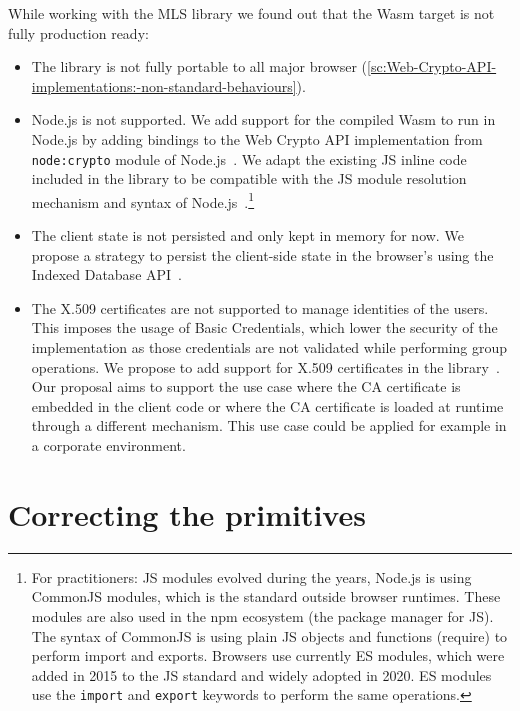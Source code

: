 While working with the MLS library we found out that the Wasm target
is not fully production ready:
\begin{itemize}
    \item The library is not fully portable to all major browser (\cref{sc:Web-Crypto-API-implementations:-non-standard-behaviours}).
    \item Node.js is not supported. We add support for the compiled Wasm to run in Node.js by adding bindings to the Web Crypto API implementation from \texttt{node:crypto} module of Node.js~\cite{NodeJsWebCryptoAPI}. We adapt the existing JS inline code included in the library to be compatible with the JS module resolution mechanism and syntax of Node.js~\cite{AWSNodeJSCodeContributions}.\footnote{For practitioners: JS modules evolved during the years, Node.js is using CommonJS modules, which is the standard outside browser runtimes. These modules are also used in the npm ecosystem (the package manager for JS). The syntax of CommonJS is using plain JS objects and functions (require) to perform import and exports. Browsers use currently ES modules, which were added in 2015 to the JS standard and widely adopted in 2020. ES modules use the \texttt{import} and \texttt{export} keywords to perform the same operations.}
    \item The client state is not persisted and only kept in memory for now. We propose a strategy to persist the client-side state in the browser's using the Indexed Database API~\cite{MlsRsWebStorageProvider, IndexedDBAPI}.
    \item The X.509 certificates are not supported to manage identities of the users. This imposes the usage of Basic Credentials, which lower the security of the implementation as those credentials are not validated while performing group operations. We propose to add support for X.509 certificates in the library~\cite{MlsRsX509Certificates}. Our proposal aims to support the use case where the CA certificate is embedded in the client code or where the CA certificate is loaded at runtime through a different mechanism. This use case could be applied for example in a corporate environment.
\end{itemize}


\section{Correcting the primitives}\label{sc:correcting-primitives}

